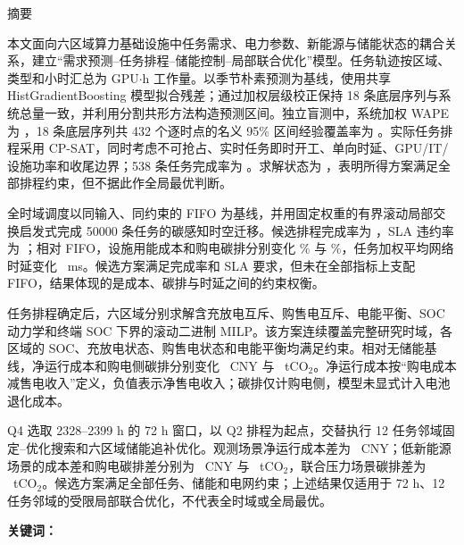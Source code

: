 \begin{center}
  {\heiti{} 摘\quad 要}
\end{center}

本文面向六区域算力基础设施中任务需求、电力参数、新能源与储能状态的耦合关系，建立“需求预测--任务排程--储能控制--局部联合优化”模型。任务轨迹按区域、类型和小时汇总为 GPU$\cdot$h 工作量。以季节朴素预测为基线，使用共享 HistGradientBoosting 模型拟合残差；通过加权层级校正保持 18 条底层序列与系统总量一致，并利用分割共形方法构造预测区间。独立盲测中，系统加权 WAPE 为 ，18 条底层序列共 432 个逐时点的名义 95\% 区间经验覆盖率为 。实际任务排程采用 CP-SAT，同时考虑不可抢占、实时任务即时开工、单向时延、GPU/IT/设施功率和收尾边界；538 条任务完成率为 。求解状态为 ，表明所得方案满足全部排程约束，但不据此作全局最优判断。

全时域调度以同输入、同约束的 FIFO 为基线，并用固定权重的有界滚动局部交换启发式完成 50000 条任务的碳感知时空迁移。候选排程完成率为 ，SLA 违约率为 ；相对 FIFO，设施用能成本和购电碳排分别变化 \% 与 \%，任务加权平均网络时延变化 ~ms。候选方案满足完成率和 SLA 要求，但未在全部指标上支配 FIFO，结果体现的是成本、碳排与时延之间的约束权衡。

任务排程确定后，六区域分别求解含充放电互斥、购售电互斥、电能平衡、SOC 动力学和终端 SOC 下界的滚动二进制 MILP。该方案连续覆盖完整研究时域，各区域的 SOC、充放电状态、购售电状态和电能平衡均满足约束。相对无储能基线，净运行成本和购电侧碳排分别变化 ~CNY 与 ~tCO$_2$。净运行成本按“购电成本减售电收入”定义，负值表示净售电收入；碳排仅计购电侧，模型未显式计入电池退化成本。

Q4 选取 2328--2399 h 的 72 h 窗口，以 Q2 排程为起点，交替执行 12 任务邻域固定--优化搜索和六区域储能追补优化。观测场景净运行成本差为 ~CNY；低新能源场景的成本差和购电碳排差分别为 ~CNY 与 ~tCO$_2$，联合压力场景碳排差为 ~tCO$_2$。候选方案满足全部任务、储能和电网约束；上述结果仅适用于 72 h、12 任务邻域的受限局部联合优化，不代表全时域或全局最优。

\noindent\textbf{关键词：}\PaperKeywords
